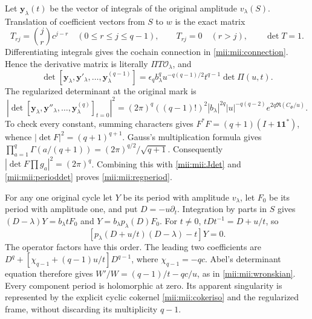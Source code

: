 Let $\mathbf y_\lambda(t)$ be the vector of integrals of the
original amplitude $v_\lambda(S)$. Translation of coefficient
vectors from $S$ to $w$ is the exact matrix
\[
 T_{rj}=\binom jr c^{j-r}\quad(0\le r\le j\le q-1),\qquad
 T_{rj}=0\quad(r>j),\qquad\det T=1.
\]
Differentiating integrals gives the cochain connection in
\eqref{mii:mii:connection}. Hence the derivative matrix is literally
$\Pi T\mathcal O_\lambda$, and
\begin{equation}\tag{MII28}\label{mii:mii:wronskian}
 \det[\mathbf y_\lambda,\mathbf y'_\lambda,\ldots,
                       \mathbf y^{(q-1)}_\lambda]
 =\epsilon_q b_\lambda^q u^{-q(q-1)/2}t^{q-1}\det\Pi(u,t).
\end{equation}
The regularized determinant at the original mark is
\begin{equation}\tag{MII29}\label{mii:mii:regperiod}
 \left|\det[\mathbf y_\lambda,\mathbf y''_\lambda,\ldots,
                    \mathbf y_\lambda^{(q)}]_{t=0}\right|^2
 =(2\pi)^q((q-1)!)^2|b_\lambda|^{2q}
     |u|^{-q(q-2)}e^{2q\Re(C_\Phi/u)}.
\end{equation}
To check every constant, summing characters gives
$F^*F=(q+1)(I+\mathbf1\mathbf1^*)$, whence
$|\det F|^2=(q+1)^{q+1}$. Gauss's multiplication formula
\cite[(5.5.6)--(5.5.7)]{mii:dlmf} gives
$\prod_{a=1}^q\Gamma(a/(q+1))=(2\pi)^{q/2}/\sqrt{q+1}$.
Consequently $|\det F\prod g_a|^2=(2\pi)^q$.
Combining this with \eqref{mii:mii:Jdet} and
\eqref{mii:mii:perioddet} proves \eqref{mii:mii:regperiod}.

For any one original cycle let $Y$ be its period with amplitude
$v_\lambda$, let $F_0$ be its period with amplitude one, and
put $D=-u\partial_t$. Integration by parts in $S$ gives
$(D-\lambda)Y=b_\lambda tF_0$ and
$Y=b_\lambda p_\lambda(D)F_0$. For $t\ne0$,
$tDt^{-1}=D+u/t$, so
\begin{equation}\tag{MII30}\label{mii:mii:scalar}
 [p_\lambda(D+u/t)(D-\lambda)-t]Y=0.
\end{equation}
The operator factors have this order. The leading two coefficients
are $D^q+[\chi_{q-1}+(q-1)u/t]D^{q-1}$, where
$\chi_{q-1}=-qc$. Abel's determinant equation therefore gives
$W'/W=(q-1)/t-qc/u$, as in \eqref{mii:mii:wronskian}.
Every component period is holomorphic at zero. Its apparent
singularity is represented by the explicit cyclic cokernel
\eqref{mii:mii:cokeriso} and the regularized frame, without discarding
its multiplicity $q-1$.

